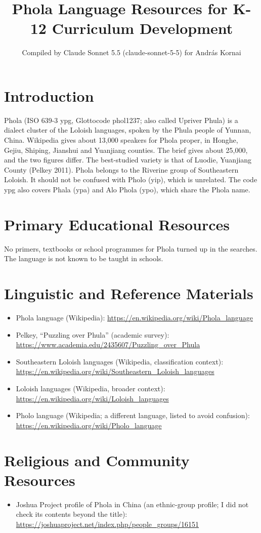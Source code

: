 \documentclass[12pt]{article}
\title{Phola Language Resources for K-12 Curriculum Development}
\author{Compiled by Claude Sonnet 5.5 (claude-sonnet-5-5) for Andr\'as Kornai}
\date{}
\begin{document}
\maketitle

\section{Introduction}
Phola (ISO 639-3 ypg, Glottocode phol1237; also called Upriver Phula) is a dialect cluster of the Loloish languages, spoken by the Phula people of Yunnan, China. Wikipedia gives about 13,000 speakers for Phola proper, in Honghe, Gejiu, Shiping, Jianshui and Yuanjiang counties. The brief gives about 25,000, and the two figures differ. The best-studied variety is that of Luodie, Yuanjiang County (Pelkey 2011). Phola belongs to the Riverine group of Southeastern Loloish. It should not be confused with Pholo (yip), which is unrelated. The code ypg also covers Phala (ypa) and Alo Phola (ypo), which share the Phola name.

\section{Primary Educational Resources}
No primers, textbooks or school programmes for Phola turned up in the searches. The language is not known to be taught in schools.

\section{Linguistic and Reference Materials}
\begin{itemize}
\item Phola language (Wikipedia): \url{https://en.wikipedia.org/wiki/Phola_language}
\item Pelkey, ``Puzzling over Phula'' (academic survey): \url{https://www.academia.edu/2435607/Puzzling_over_Phula}
\item Southeastern Loloish languages (Wikipedia, classification context): \url{https://en.wikipedia.org/wiki/Southeastern_Loloish_languages}
\item Loloish languages (Wikipedia, broader context): \url{https://en.wikipedia.org/wiki/Loloish_languages}
\item Pholo language (Wikipedia; a different language, listed to avoid confusion): \url{https://en.wikipedia.org/wiki/Pholo_language}
\end{itemize}

\section{Religious and Community Resources}
\begin{itemize}
\item Joshua Project profile of Phola in China (an ethnic-group profile; I did not check its contents beyond the title): \url{https://joshuaproject.net/index.php/people_groups/16151}
\end{itemize}
\end{document}
